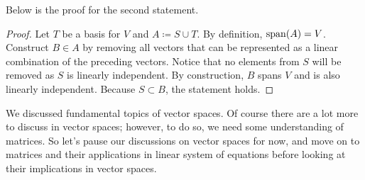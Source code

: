 \documentclass[../../main.tex]{subfiles}
\begin{document}
Below is the proof for the second statement.

\begin{proof}
Let $T$ be a basis for $V$ and $A \coloneqq S \cup T$. By definition,
$\operatorname{span}(A) = V$. Construct $B \in A$ by removing all vectors that can
be represented as a linear combination of the preceding vectors.
Notice that no elements from $S$ will be removed as $S$ is linearly
independent. By construction, $B$ spans $V$ and is also linearly
independent. Because $S \subset B$, the statement holds.
\end{proof}

We discussed fundamental topics of vector spaces. Of course there
are a lot more to discuss in vector spaces; however, to do so,
we need some understanding of matrices. So let's pause our discussions
on vector spaces for now, and move on to matrices and their
applications in linear system of equations before looking at their
implications in vector spaces.
\end{document}
